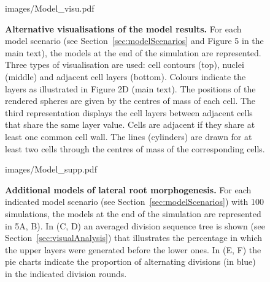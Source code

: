 \documentclass[11pt,a4paper, final]{article}
\begin{document}
\clearpage
%
\begin{figure}[htbp]
\centering
	\begin{overpic}[width=1.0\linewidth]{images/Model_visu.pdf}
	\end{overpic}
\caption[Alternative visualisations of the model results.]
{{\bf Alternative visualisations of the model results.} For each model scenario (see Section~\ref{sec:modelScenarios} and Figure 5 in the main text), the models at the end of the simulation are represented. Three types of visualisation are used: cell contours (top), nuclei (middle) and adjacent cell layers (bottom). Colours indicate the layers as illustrated in Figure 2D (main text). The positions of the rendered spheres are given by the centres of mass of each cell. The third representation displays the cell layers between adjacent cells that share the same layer value. Cells are adjacent if they share at least one common cell wall. The lines (cylinders) are drawn for at least two cells through the centres of mass of the corresponding cells.
}
\label{fig:visumodel}
\end{figure}
\clearpage

\begin{figure}[htbp]
\centering
	\begin{overpic}[width=1.0\linewidth]{images/Model_supp.pdf}
	\end{overpic}
\caption[Additional models of lateral root morphogenesis.]
{{\bf Additional models of lateral root morphogenesis.} For each indicated model scenario (see Section~\ref{sec:modelScenarios}) with 100 simulations, the models at the end of the simulation are represented in 5A, B). In (C, D) an averaged division sequence tree is shown (see Section~\ref{sec:visualAnalysis}) that illustrates the percentage in which the upper layers were generated before the lower ones. In (E, F) the pie charts indicate the proportion of alternating divisions (in blue) in the indicated division rounds.
}
\label{fig:Modelsupp}
\end{figure}
%
\end{document}
